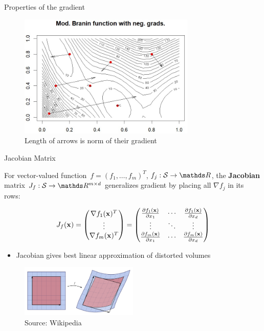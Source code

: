 \documentclass[11pt,compress,t,notes=noshow, xcolor=table]{beamer}
\begin{document}
\begin{vbframe}{Properties of the gradient}
\framebreak

\begin{figure}
    \centering
    \includegraphics[width=0.75\textwidth]{figure_man/branin.jpg}
    \caption*{Length of arrows is norm of their gradient}
\end{figure}

\end{vbframe}


\begin{vbframe}{Jacobian Matrix}

For vector-valued function~$f = (f_1,\dots,f_m)^T$, $f_j:\mathcal{S}\to\R$, the \textbf{Jacobian} matrix $J_f:\mathcal{S} \to \R^{m\times d}$ generalizes gradient by placing all $\nabla f_j$ in its rows:

\begin{equation*}
    J_f(\mathbf{x}) = \begin{pmatrix}
        \nabla f_1(\mathbf{x})^T \\
        \vdots \\
        \nabla f_m(\mathbf{x})^T 
	\end{pmatrix}
    =
    \begin{pmatrix}
        \frac{\partial f_1(\mathbf{x})}{\partial x_1} & \cdots & \frac{\partial f_1(\mathbf{x})}{\partial x_d} \\
        \vdots &  \ddots & \vdots \\
        \frac{\partial f_m(\mathbf{x})}{\partial x_1} & \cdots & \frac{\partial f_m(\mathbf{x})}{\partial x_d}
	\end{pmatrix}
\end{equation*}

\begin{itemize}
    \item Jacobian gives best linear approximation of distorted volumes
\end{itemize}

\begin{figure}
    \centering
    \includegraphics[width=0.5\textwidth]{figure_man/Jacobian.png}
    \caption*{\footnotesize Source: Wikipedia}
\end{figure}

\end{vbframe}
\end{document}
